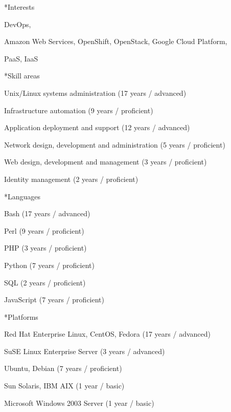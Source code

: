 \documentclass[10pt, a4paper, final]{article}
\begin{document}
\begin{minipage}[t]{0.32\linewidth}
\begin{section}
    \vspace{2em}
    \small
    \begin{subsection}*{Interests}
      \begin{inparadesc}
        \item DevOps,
        \item Amazon Web Services, OpenShift, OpenStack, Google Cloud Platform,
        \item PaaS, IaaS
      \end{inparadesc}
    \end{subsection}
    \vspace{1em}
    \begin{subsection}*{Skill areas}
      \begin{compactitem}
        \item Unix/Linux systems administration (17 years / advanced) 
        \item Infrastructure automation (9 years / proficient) 
        \item Application deployment and support (12 years / advanced) 
        \item Network design, development and administration (5 years / proficient) 
        \item Web design, development and management (3 years / proficient) 
        \item Identity management (2 years / proficient) 
      \end{compactitem}
    \end{subsection}
    \vspace{1em}
    \begin{subsection}*{Languages}
      \begin{compactitem}
        \item Bash (17 years / advanced) 
        \item Perl (9 years / proficient) 
        \item PHP (3 years / proficient) 
        \item Python (7 years / proficient) 
        \item SQL (2 years / proficient) 
        \item JavaScript (7 years / proficient) 
      \end{compactitem}
    \end{subsection}
    \vspace{1em}
    \begin{subsection}*{Platforms}
      \begin{compactitem}
        \item Red Hat Enterprise Linux, CentOS, Fedora (17 years / advanced) 
        \item SuSE Linux Enterprise Server (3 years / advanced) 
        \item Ubuntu, Debian (7 years / proficient) 
        \item Sun Solaris, IBM AIX (1 year / basic) 
        \item Microsoft Windows 2003 Server (1 year / basic) 
      \end{compactitem}
    \end{subsection}
  \end{section}
\end{minipage}
\end{document}
